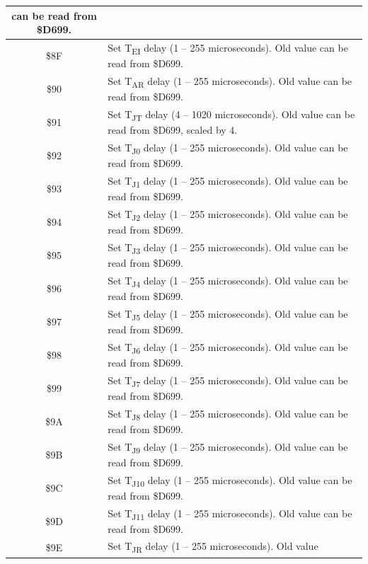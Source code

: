 \begin{center}
\begin{longtable}{|c|L{8cm}|}
        can be read from \$D699. \\ \hline
        \$8F & Set T\textsubscript{EI} delay (1 -- 255 microseconds). Old value
        can be read from \$D699. \\ \hline
        \$90 & Set T\textsubscript{AR} delay (1 -- 255 microseconds). Old value
        can be read from \$D699. \\ \hline
        \$91 & Set T\textsubscript{JT} delay (4 -- 1020 microseconds). Old value
        can be read from \$D699, scaled by 4. \\ \hline
        \$92 & Set T\textsubscript{J0} delay (1 -- 255 microseconds). Old value
        can be read from \$D699. \\ \hline
        \$93 & Set T\textsubscript{J1} delay (1 -- 255 microseconds). Old value
        can be read from \$D699. \\ \hline
        \$94 & Set T\textsubscript{J2} delay (1 -- 255 microseconds). Old value
        can be read from \$D699. \\ \hline
        \$95 & Set T\textsubscript{J3} delay (1 -- 255 microseconds). Old value
        can be read from \$D699. \\ \hline
        \$96 & Set T\textsubscript{J4} delay (1 -- 255 microseconds). Old value
        can be read from \$D699. \\ \hline
        \$97 & Set T\textsubscript{J5} delay (1 -- 255 microseconds). Old value
        can be read from \$D699. \\ \hline
        \$98 & Set T\textsubscript{J6} delay (1 -- 255 microseconds). Old value
        can be read from \$D699. \\ \hline
        \$99 & Set T\textsubscript{J7} delay (1 -- 255 microseconds). Old value
        can be read from \$D699. \\ \hline
        \$9A & Set T\textsubscript{J8} delay (1 -- 255 microseconds). Old value
        can be read from \$D699. \\ \hline
        \$9B & Set T\textsubscript{J9} delay (1 -- 255 microseconds). Old value
        can be read from \$D699. \\ \hline
        \$9C & Set T\textsubscript{J10} delay (1 -- 255 microseconds). Old value
        can be read from \$D699. \\ \hline
        \$9D & Set T\textsubscript{J11} delay (1 -- 255 microseconds). Old value
        can be read from \$D699. \\ \hline
        \$9E & Set T\textsubscript{JR} delay (1 -- 255 microseconds). Old value

\end{longtable}
\end{center}
